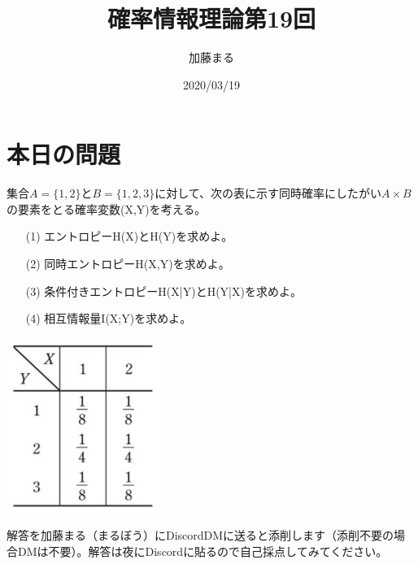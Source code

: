 \documentclass[a4j,uplatex,dvipdfmx]{jsarticle}
\title{確率情報理論第19回}
\author{加藤まる}
\date{2020/03/19}
\begin{document}
\maketitle

\section*{本日の問題}
集合$A=\{ 1,2\}$と$B=\{ 1,2,3 \}$に対して、次の表に示す同時確率にしたがい$A \times B$の要素をとる確率変数(X,Y)を考える。
\begin{itemize}
  \item[(1)]エントロピーH(X)とH(Y)を求めよ。
  \item[(2)]同時エントロピーH(X,Y)を求めよ。
  \item[(3)]条件付きエントロピーH(X|Y)とH(Y|X)を求めよ。
  \item[(4)]相互情報量I(X;Y)を求めよ。   
\end{itemize}
\includegraphics[width=5cm]{sec19fig.png}




解答を加藤まる（まるぼう）にDiscordDMに送ると添削します（添削不要の場合DMは不要）。解答は夜にDiscordに貼るので自己採点してみてください。
\end{document}
